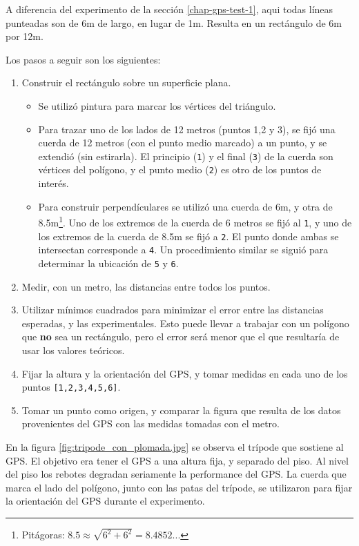 \documentclass[spanish,12pt,a4paper,titlepage]{report}
\begin{document}
A diferencia del experimento de la sección \ref{chap-gps-test-1}, aqui todas líneas punteadas son de 6m de largo, en lugar de 1m. Resulta en un rectángulo de 6m por 12m.

Los pasos a seguir son los siguientes:

\begin{enumerate}
\item Construir el rectángulo sobre un superficie plana.
  \begin{itemize}
  \item Se utilizó pintura para marcar los vértices del triángulo.
  \item Para trazar uno de los lados de 12 metros (puntos 1,2 y 3), se fijó una cuerda de 12 metros (con el punto medio marcado) a un punto, y se extendió (sin estirarla). El principio (\verb+1+) y el final (\verb+3+) de la cuerda son vértices del polígono, y el punto medio (\verb+2+) es otro de los puntos de interés.
  \item Para construir perpendículares se utilizó una cuerda de 6m, y otra de 8.5m\footnote{Pitágoras: $8.5 \approx \sqrt{6^2 + 6^2} = 8.4852...$}. Uno de los extremos de la cuerda de 6 metros se fijó al \verb+1+, y uno de los extremos de la cuerda de 8.5m se fijó a \verb+2+. El punto donde ambas se intersectan corresponde a \verb+4+. Un procedimiento similar se siguió para determinar la ubicación de \verb+5+ y \verb+6+.
  \end{itemize}
\item Medir, con un metro, las distancias entre todos los puntos.
\item Utilizar mínimos cuadrados para minimizar el error entre las distancias esperadas, y las experimentales. Esto puede llevar a trabajar con un polígono que \textbf{no} sea un rectángulo, pero el error será menor que el que resultaría de usar los valores teóricos.
\item Fijar la altura y la orientación del GPS, y tomar medidas en cada uno de los puntos \verb+[1,2,3,4,5,6]+.
\item Tomar un punto como origen, y comparar la figura que resulta de los datos provenientes del GPS con las medidas tomadas con el metro.
\end{enumerate}

En la figura \ref{fig:tripode_con_plomada.jpg} se observa el trípode que sostiene al GPS. El objetivo era tener el GPS a una altura fija, y separado del piso. Al nivel del piso los rebotes degradan seriamente la performance del GPS. La cuerda que marca el lado del polígono, junto con las patas del trípode, se utilizaron para fijar la orientación del GPS durante el experimento.
\end{document}
